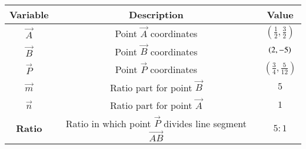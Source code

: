 \begin{tabular}{|c|c|c|}
  \hline
        \textbf{Variable} & \textbf{Description}                                      & \textbf{Value}                          \\
        \hline
     
        $\vec{A}$      & Point $\vec{A}$ coordinates                                  & $\left(\frac{1}{2}, \frac{3}{2}\right)$ \\
        \hline
        $\vec{B}$      & Point $\vec{B}$ coordinates                                  & $\left(2, -5\right)$                        \\
        \hline
        $\vec{P}$ & Point $\vec{P}$ coordinates & $\left(\frac{3}{4}, \frac{5}{12}\right)$ \\
        \hline
        $\vec{m}$ & Ratio part for point $\vec{B}$  & $5$  \\
        \hline
        $\vec{n}$      & Ratio part for point $\vec{A}$  & $1$  \\
        \hline
        \textbf{Ratio}    & Ratio in which point $\vec{P}$ divides line segment $\vec{AB}$  & $5:1$                          \\
        \hline
        
    \end{tabular}